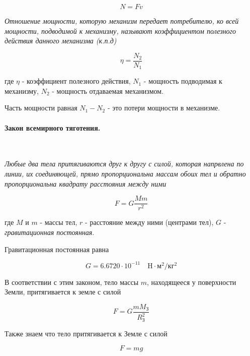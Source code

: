 \documentclass[a4paper,12pt]{article}
\begin{document}
		\begin{equation}
			N = Fv
		\end{equation}

		\clearpage{}
		\textit{Отношение мощности, которую механизм передает потребителю, ко всей мощности, подводимой 
		к механизму, называют коэффициентом полезного действия данного механизма (к.п.д)}

		\begin{equation}
			\eta = \frac{N_2}{N_1}
		\end{equation}

		где $\eta$ - коэффициент полезного действия, $N_1$ - мощность подводимая к механизму, $N_2$ -
		мощность отдаваемая механизмом.

		Часть мощности равная $N_1-N_2$ - это потери мощности в механизме. 


		\paragraph{Закон всемирного тяготения.} \

		\textit{Любые два тела притягиваются друг к другу с силой, которая напрвлена по линии, их
		соединяющей, прямо пропорциональна массам обоих тел и обратно пропорциональна квадрату
		расстояния между ними}

		\begin{equation}
			F = G \frac{Mm}{r^2}
		\end{equation}

		где $M$ и $m$ - массы тел, $r$ - расстояние между ними (центрами тел), 
		$G$ - \textit{гравитационная постоянная}.

		Гравитационная постоянная равна

		\begin{equation*}
			G = 6.6720 \cdot 10^{-11} \quad \text{H} \cdot \text{м}^2 / \text{кг}^2
		\end{equation*}

		В соответствии с этим законом, тело массы $m$, находящееся у поверхности Земли, 
		притягивается к земле с силой

		\begin{equation*}
			F = G \frac{mM_\text{З}}{R^2_\text{З}}
		\end{equation*}

		Также знаем что тело притягивается к Земле с силой

		\begin{equation*}
			F = mg
		\end{equation*}
	
\end{document}
